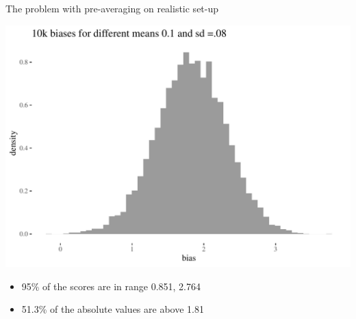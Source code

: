 \documentclass[
  10pt,
  ignorenonframetext,
  x11names, dvipsnames, bibspacing,natbib, table]{beamer}
\providecommand{\tightlist}{%
  \setlength{\itemsep}{0pt}\setlength{\parskip}{0pt}}
\begin{document}
\begin{frame}{The problem with pre-averaging on realistic set-up}
\protect\hypertarget{the-problem-with-pre-averaging-on-realistic-set-up-2}{}
\vspace{1mm}
\footnotesize

\begin{center}\includegraphics[width=0.9\linewidth]{presentationBoston_files/figure-beamer/unnamed-chunk-14-1} \end{center}
\vspace{1mm}
\footnotesize

\normalsize

\footnotesize

\vspace{-2mm}

\begin{itemize}
\tightlist
\item
  95\% of the scores are in range 0.851, 2.764
\item
  51.3\% of the absolute values are above 1.81
\end{itemize}
\end{frame}
\end{document}
